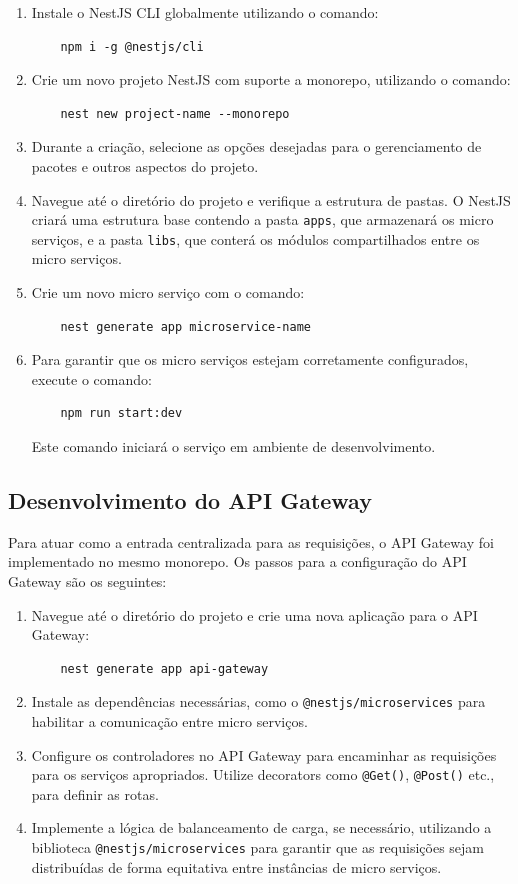 \begin{enumerate}
    \item Instale o NestJS CLI globalmente utilizando o comando:
    \begin{verbatim}
    npm i -g @nestjs/cli
    \end{verbatim}
    \item Crie um novo projeto NestJS com suporte a monorepo, utilizando o comando:
    \begin{verbatim}
    nest new project-name --monorepo
    \end{verbatim}
    \item Durante a criação, selecione as opções desejadas para o gerenciamento de pacotes e outros aspectos do projeto.
    \item Navegue até o diretório do projeto e verifique a estrutura de pastas. O NestJS criará uma estrutura base contendo a pasta \texttt{apps}, que armazenará os micro serviços, e a pasta \texttt{libs}, que conterá os módulos compartilhados entre os micro serviços.
    \item Crie um novo micro serviço com o comando:
    \begin{verbatim}
    nest generate app microservice-name
    \end{verbatim}
    \item Para garantir que os micro serviços estejam corretamente configurados, execute o comando:
    \begin{verbatim}
    npm run start:dev
    \end{verbatim}
    Este comando iniciará o serviço em ambiente de desenvolvimento.
\end{enumerate}

\subsection{Desenvolvimento do API Gateway}
Para atuar como a entrada centralizada para as requisições, o API Gateway foi implementado no mesmo monorepo. Os passos para a configuração do API Gateway são os seguintes:

\begin{enumerate}
    \item Navegue até o diretório do projeto e crie uma nova aplicação para o API Gateway:
    \begin{verbatim}
    nest generate app api-gateway
    \end{verbatim}
    \item Instale as dependências necessárias, como o \texttt{@nestjs/microservices} para habilitar a comunicação entre micro serviços.
    \item Configure os controladores no API Gateway para encaminhar as requisições para os serviços apropriados. Utilize decorators como \texttt{@Get()}, \texttt{@Post()} etc., para definir as rotas.
    \item Implemente a lógica de balanceamento de carga, se necessário, utilizando a biblioteca \texttt{@nestjs/microservices} para garantir que as requisições sejam distribuídas de forma equitativa entre instâncias de micro serviços.
\end{enumerate}

